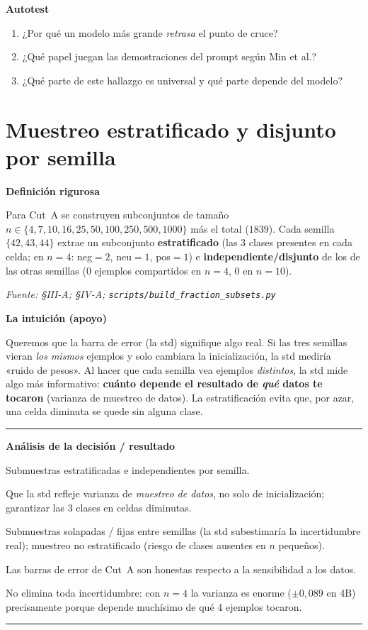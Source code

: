 \documentclass[11pt,a4paper]{article}
\newcommand{\nivel}[1]{\medskip\noindent\textbf{\textcolor{blue!45!black}{#1}}\par\nopagebreak\smallskip}
\newcommand{\fuente}[1]{\nopagebreak\par\hfill{\footnotesize\textit{Fuente: #1}}\par}
\newenvironment{analisis}{%
  \medskip\par\noindent\rule{\linewidth}{0.4pt}\par\nopagebreak
  \textbf{Análisis de la decisión / resultado}\par\nopagebreak\smallskip
  \begin{description}[leftmargin=2.6cm,style=nextline,font=\bfseries]
}{%
  \end{description}\noindent\rule{\linewidth}{0.4pt}\par\medskip
}
\begin{document}
\nivel{Autotest}
\begin{enumerate}[nosep]
  \item ¿Por qué un modelo más grande \emph{retrasa} el punto de cruce?
  \item ¿Qué papel juegan las demostraciones del prompt según Min et al.?
  \item ¿Qué parte de este hallazgo es universal y qué parte depende del modelo?
\end{enumerate}

\section{Muestreo estratificado y disjunto por semilla}\label{sec:subsampling}

\nivel{Definición rigurosa}
Para Cut~A se construyen subconjuntos de tamaño $n\in\{4,7,10,16,25,50,100,250,500,1000\}$ más el
total ($1839$). Cada semilla $\{42,43,44\}$ extrae un subconjunto \textbf{estratificado}
(las 3 clases presentes en cada celda; en $n{=}4$: neg$=2$, neu$=1$, pos$=1$) e
\textbf{independiente/disjunto} de los de las otras semillas (0 ejemplos compartidos en $n{=}4$, 0 en
$n{=}10$).
\fuente{\S III-A; \S IV-A; \texttt{scripts/build\_fraction\_subsets.py}}

\nivel{La intuición (apoyo)}
Queremos que la barra de error (la std) signifique algo real. Si las tres semillas vieran \emph{los
mismos} ejemplos y solo cambiara la inicialización, la std mediría «ruido de pesos». Al hacer que
cada semilla vea ejemplos \emph{distintos}, la std mide algo más informativo: \textbf{cuánto depende
el resultado de \emph{qué} datos te tocaron} (varianza de muestreo de datos). La estratificación
evita que, por azar, una celda diminuta se quede sin alguna clase.

\begin{analisis}
  \item[Qué] Submuestras estratificadas e independientes por semilla.
  \item[Por qué] Que la std refleje varianza de \emph{muestreo de datos}, no solo de inicialización;
        garantizar las 3 clases en celdas diminutas.
  \item[Alternativas descartadas] Submuestras solapadas / fijas entre semillas (la std subestimaría
        la incertidumbre real); muestreo no estratificado (riesgo de clases ausentes en $n$ pequeños).
  \item[Qué significa] Las barras de error de Cut~A son honestas respecto a la sensibilidad a los
        datos.
  \item[Qué NO significa] No elimina toda incertidumbre: con $n{=}4$ la varianza es enorme
        ($\pm0{,}089$ en 4B) precisamente porque depende muchísimo de qué 4 ejemplos tocaron.
\end{analisis}
\end{document}
